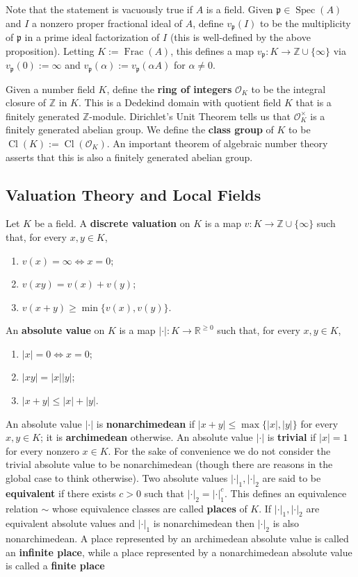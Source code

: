 \documentclass[11pt]{article}
\newcommand{\R}{\mathbb{R}}
\newcommand{\Z}{\mathbb{Z}}
\newcommand{\abs}[1]{\left\lvert#1\right\rvert}
\newcommand{\mc}[1]{\mathcal{#1}}
\newcommand{\mf}[1]{\mathfrak{#1}}
\DeclareMathOperator{\Cl}{Cl}
\DeclareMathOperator{\Frac}{Frac}
\DeclareMathOperator{\Spec}{Spec}
\renewcommand{\O}{\mc{O}}
\newenvironment{enum}[1]{
\begin{enumerate}[label=\textup{({#1*})}]
}
{
\end{enumerate}
}
\begin{document}
Note that the statement is vacuously true if $A$ is a field. Given $\mf{p}\in\Spec(A)$ and $I$ a nonzero proper fractional ideal of $A$, define $v_{\mf{p}}(I)$ to be the multiplicity of $\mf{p}$ in a prime ideal factorization of $I$ (this is well-defined by the above proposition). Letting $K:=\Frac(A)$, this defines a map $v_{\mf{p}}: K\to\Z\cup\{\infty\}$ via $v_{\mf{p}}(0):=\infty$ and $v_{\mf{p}}(\alpha):=v_{\mf{p}}(\alpha A)$ for $\alpha\neq0$.

Given a number field $K$, define the \textbf{ring of integers} $\O_K$ to be the integral closure of $\Z$ in $K$. This is a Dedekind domain with quotient field $K$ that is a finitely generated $\Z$-module. Dirichlet's Unit Theorem tells us that $\O_K^{\times}$ is a finitely generated abelian group. We define the \textbf{class group} of $K$ to be $\Cl(K):=\Cl(\O_K)$. An important theorem of algebraic number theory asserts that this is also a finitely generated abelian group. 

\subsection{Valuation Theory and Local Fields}
Let $K$ be a field. A \textbf{discrete valuation} on $K$ is a map $v: K\to\Z\cup\{\infty\}$ such that, for every $x,y\in K$,
\begin{enum}{\roman}
\item $v(x)=\infty\iff x=0$;
\item $v(xy)=v(x)+v(y)$;
\item $v(x+y)\geq\min\{v(x),v(y)\}$.
\end{enum}
An \textbf{absolute value} on $K$ is a map $\abs{\cdot}: K\to\R^{\geq0}$ such that, for every $x,y\in K$,
\begin{enum}{\roman}
\item $|x|=0\iff x=0$;
\item $|xy|=|x||y|$;
\item $|x+y|\leq|x|+|y|$.
\end{enum}
An absolute value $\abs{\cdot}$ is \textbf{nonarchimedean} if $|x+y|\leq\max\{|x|,|y|\}$ for every $x,y\in K$; it is \textbf{archimedean} otherwise. An absolute value $\abs{\cdot}$ is \textbf{trivial} if $|x|=1$ for every nonzero $x\in K$. For the sake of convenience we do not consider the trivial absolute value to be nonarchimedean (though there are reasons in the global case to think otherwise). Two absolute values $\abs{\cdot}_1,\abs{\cdot}_2$ are said to be \textbf{equivalent} if there exists $c>0$ such that $\abs{\cdot}_2=\abs{\cdot}_1^c$. This defines an equivalence relation $\sim$ whose equivalence classes are called \textbf{places} of $K$. If $\abs{\cdot}_1,\abs{\cdot}_2$ are equivalent absolute values and $\abs{\cdot}_1$ is nonarchimedean then $\abs{\cdot}_2$ is also nonarchimedean. A place represented by an archimedean absolute value is called an \textbf{infinite place}, while a place represented by a nonarchimedean absolute value is called a \textbf{finite place}
\end{document}
